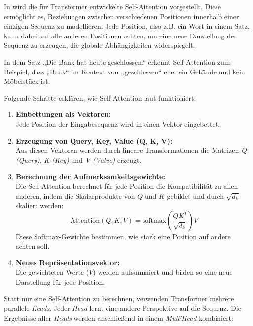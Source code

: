 In \cite{vaswani2023attentionneed} wird die für Transformer entwickelte Self-Attention vorgestellt.
Diese ermöglicht es, Beziehungen zwischen verschiedenen Positionen innerhalb einer einzigen Sequenz zu modellieren. 
Jede Position, also z.B. ein Wort in einem Satz, kann dabei auf alle anderen Positionen achten, um eine neue Darstellung der Sequenz zu erzeugen, 
die globale Abhängigkeiten widerspiegelt.

In dem Satz „Die Bank hat heute geschlossen.“ erkennt Self-Attention zum Beispiel, dass „Bank“ im Kontext von „geschlossen“ eher ein Gebäude 
und kein Möbelstück ist.

Folgende Schritte erklären, wie Self-Attention laut \cite{vaswani2023attentionneed} funktioniert:

\begin{enumerate}
    \item \textbf{Einbettungen als Vektoren:} \\
    Jede Position der Eingabesequenz wird in einen Vektor eingebettet.

    \item \textbf{Erzeugung von Query, Key, Value (Q, K, V):} \\
    Aus diesen Vektoren werden durch lineare Transformationen die Matrizen \textit{Q (Query)}, \textit{K (Key)} und \textit{V (Value)} erzeugt.

    \item \textbf{Berechnung der Aufmerksamkeitsgewichte:} \\
    Die Self-Attention berechnet für jede Position die Kompatibilität zu allen anderen, indem die Skalarprodukte von $Q$ und $K$ gebildet und durch $\sqrt{d_k}$ skaliert werden:
    \[
    \text{Attention}(Q, K, V) = \text{softmax}\left(\frac{QK^T}{\sqrt{d_k}}\right) V
    \]
    Diese Softmax-Gewichte bestimmen, wie stark eine Position auf andere achten soll.

    \item \textbf{Neues Repräsentationsvektor:} \\
    Die gewichteten Werte ($V$) werden aufsummiert und bilden so eine neue Darstellung für jede Position. 
\end{enumerate}

Statt nur eine Self-Attention zu berechnen, verwenden Transformer mehrere parallele \textit{Heads}. Jeder \textit{Head} lernt eine andere Perspektive auf die Sequenz. 
Die Ergebnisse aller \textit{Heads} werden anschließend in einem \textit{MultiHead} kombiniert:

